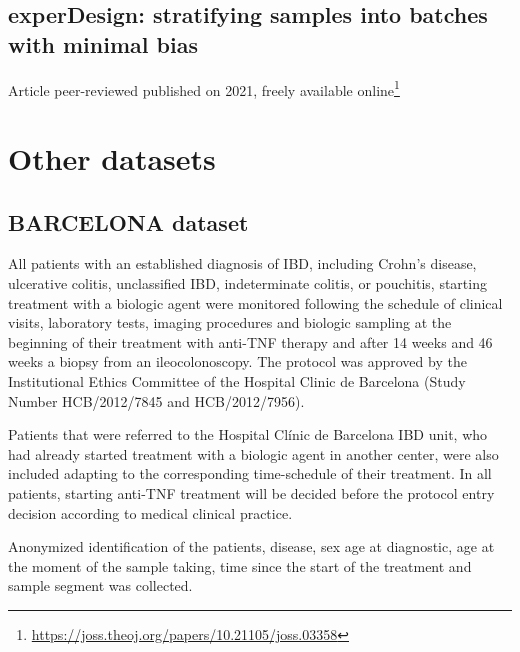 \documentclass[
  12pt,
  a4paper,
  twoside,
  openright]{book}
\DeclareRobustCommand{\href}[2]{#2\footnote{\url{#1}}}
\begin{document}


\hypertarget{app-experDesign}{%
\section{experDesign: stratifying samples into batches with minimal bias}\label{app-experDesign}}


Article peer-reviewed published on 2021, freely \href{https://joss.theoj.org/papers/10.21105/joss.03358}{available online}



\hypertarget{other-datasets}{%
\chapter{Other datasets}\label{other-datasets}}

\hypertarget{barcelona}{%
\section{BARCELONA dataset}\label{barcelona}}

All patients with an established diagnosis of IBD, including Crohn's disease, ulcerative colitis, unclassified IBD, indeterminate colitis, or pouchitis, starting treatment with a biologic agent were monitored following the schedule of clinical visits, laboratory tests, imaging procedures and biologic sampling at the beginning of their treatment with anti-TNF therapy and after 14 weeks and 46 weeks a biopsy from an ileocolonoscopy.
The protocol was approved by the Institutional Ethics Committee of the Hospital Clinic de Barcelona (Study Number HCB/2012/7845 and HCB/2012/7956).

Patients that were referred to the Hospital Clínic de Barcelona IBD unit, who had already started treatment with a biologic agent in another center, were also included adapting to the corresponding time-schedule of their treatment.
In all patients, starting anti-TNF treatment will be decided before the protocol entry decision according to medical clinical practice.

Anonymized identification of the patients, disease, sex age at diagnostic, age at the moment of the sample taking, time since the start of the treatment and sample segment was collected.
\end{document}
